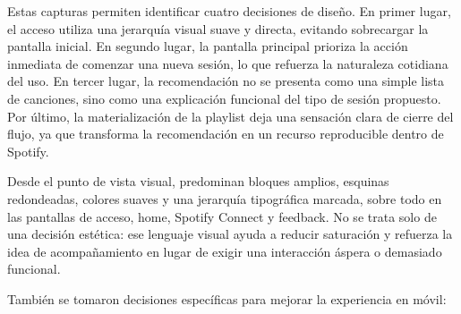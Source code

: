 Estas capturas permiten identificar cuatro decisiones de diseño. En primer
lugar, el acceso utiliza una jerarquía visual suave y directa, evitando
sobrecargar la pantalla inicial. En segundo lugar, la pantalla principal
prioriza la acción inmediata de comenzar una nueva sesión, lo que refuerza la
naturaleza cotidiana del uso. En tercer lugar, la recomendación no se presenta
como una simple lista de canciones, sino como una explicación funcional del
tipo de sesión propuesto. Por último, la materialización de la playlist deja
una sensación clara de cierre del flujo, ya que transforma la recomendación en
un recurso reproducible dentro de Spotify.

Desde el punto de vista visual, predominan bloques amplios, esquinas redondeadas,
colores suaves y una jerarquía tipográfica marcada, sobre todo en las pantallas
de acceso, home, Spotify Connect y feedback. No se trata solo de una decisión
estética: ese lenguaje visual ayuda a reducir saturación y refuerza la idea de
acompañamiento en lugar de exigir una interacción áspera o demasiado funcional.

También se tomaron decisiones específicas para mejorar la experiencia en móvil:

